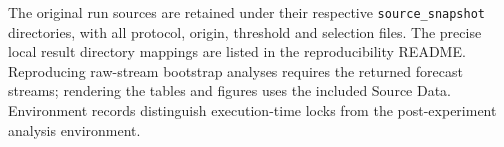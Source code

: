 \documentclass[11pt,a4paper]{article}
\begin{document}
The original run sources are retained under their respective \texttt{source\_snapshot} directories, with all protocol, origin, threshold and selection files. The precise local result directory mappings are listed in the reproducibility README. Reproducing raw-stream bootstrap analyses requires the returned forecast streams; rendering the tables and figures uses the included Source Data. Environment records distinguish execution-time locks from the post-experiment analysis environment.
\end{document}
